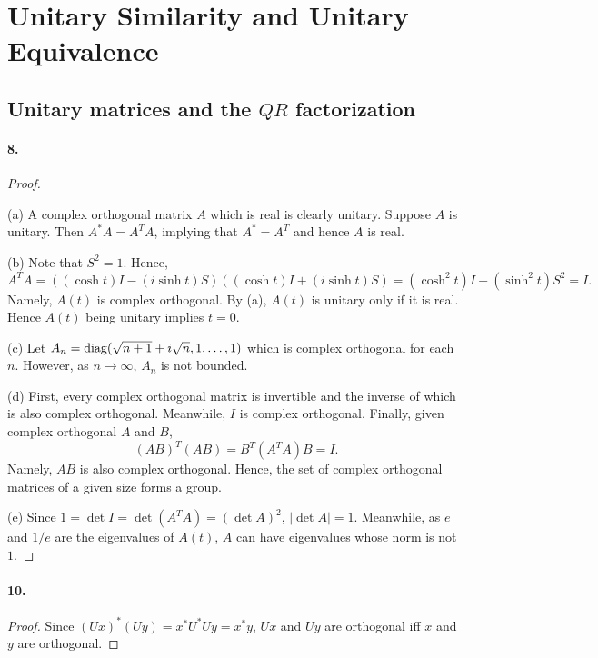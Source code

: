 \section{Unitary Similarity and Unitary Equivalence}
\subsection{Unitary matrices and the $QR$ factorization}
  \paragraph{8.}
  \begin{proof}
    $\,$\par
    (a) A complex orthogonal matrix $A$ which is real is clearly unitary. 
    Suppose $A$ is unitary. Then $A^*A=A^TA$, implying that $A^*=A^T$ and hence
    $A$ is real.\par
    (b) Note that $S^2=1$. Hence,
    \[
      A^TA = ((\cosh t)I-(i\sinh t)S)((\cosh t)I+(i\sinh t)S)=
      (\cosh^2 t)I + (\sinh^2 t)S^2 = I.
    \]
    Namely, $A(t)$ is complex orthogonal. By (a), $A(t)$ is unitary only if it
    is real. Hence $A(t)$ being unitary implies $t=0$. \par
    (c) Let $A_n=\operatorname{diag}(\sqrt{n+1}+i\sqrt{n},1,\dots,1)$ which is complex 
    orthogonal for each $n$. However, as $n\to\infty$, $A_n$ is not bounded.\par
    (d) First, every complex orthogonal matrix is invertible and the inverse of
    which is also complex orthogonal. Meanwhile, $I$ is complex orthogonal. 
    Finally, given complex orthogonal $A$ and $B$,
    \[
      (AB)^T(AB) = B^T(A^TA)B = I.
    \]
    Namely, $AB$ is also complex orthogonal. Hence, the set of complex 
    orthogonal matrices of a given size forms a group.\par
    (e) Since $1=\det I = \det(A^TA) = (\det A)^2$, $|\det A|=1$. Meanwhile, as
    $e$ and $1/e$ are the eigenvalues of $A(t)$, $A$ can have eigenvalues whose
    norm is not $1$.\par
  \end{proof}

  \paragraph{10.}
  \begin{proof}
    Since $(Ux)^*(Uy) = x^*U^*Uy = x^*y$, $Ux$ and $Uy$ are orthogonal iff $x$
    and $y$ are orthogonal.
  \end{proof}

